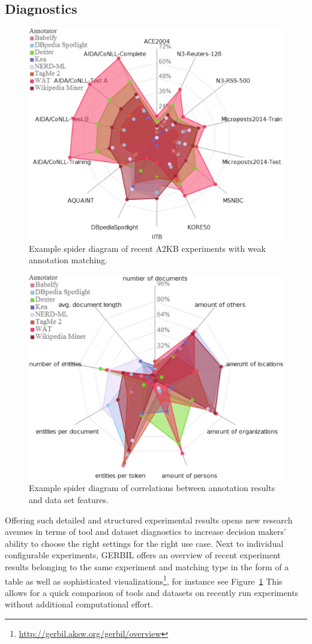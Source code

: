 \subsection{Diagnostics}
\begin{figure}[tb!]
\centering
\includegraphics[width=0.6\linewidth]{part_02/benchmarking/WWW_GERBIL/results.pdf}
\caption{Example spider diagram of recent A2KB experiments with weak annotation matching.}
\label{cha333:fig:spiderfmeasure}
\end{figure}

\begin{figure}[tb!]
\centering
\includegraphics[width=0.6\linewidth]{part_02/benchmarking/WWW_GERBIL/correlations.pdf}
\caption{Example spider diagram of correlations between annotation results and data set features.}
\label{cha333:fig:spidercorrelations}
\end{figure}

Offering such detailed and structured experimental results opens new research avenues in terms of tool and dataset diagnostics to increase decision makers' ability to choose the right settings for the right use case.
Next to individual configurable experiments, GERBIL offers an overview of recent experiment results belonging to the same experiment and matching type in the form of a table as well as sophisticated visualizations\footnote{\url{http://gerbil.aksw.org/gerbil/overview}}, for instance see Figure~\ref{cha333:fig:spiderfmeasure}
This allows for a quick comparison of tools and datasets on recently run experiments without additional computational effort.

